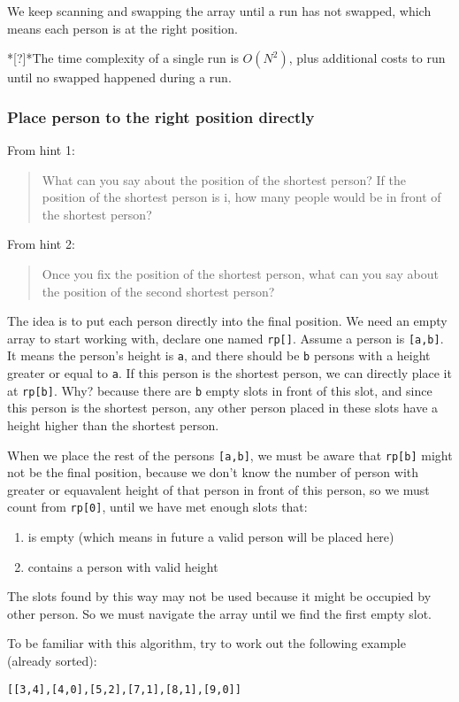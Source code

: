 \documentclass[11pt]{article}
\begin{document}
We keep scanning and swapping the array until a run has not swapped, which means each person is at the right position.

*[?]*The time complexity of a single run is \(O(N^2)\), plus additional costs to run until no swapped happened during a run.
\subsubsection{Place person to the right position directly}
\label{sec:org4f2c32e}
From hint 1:
\begin{quote}
What can you say about the position of the shortest person? 
If the position of the shortest person is i, how many people would be in front of the shortest person?
\end{quote}

From hint 2:
\begin{quote}
Once you fix the position of the shortest person, what can you say about the position of the second shortest person?
\end{quote}

The idea is to put each person directly into the final position. We need an empty array to start working with, declare one named \texttt{rp[]}. Assume a person is \texttt{[a,b]}. It means the person's height is \texttt{a}, and there should be \texttt{b} persons with a height greater or equal to \texttt{a}. If this person is the shortest person, we can directly place it at \texttt{rp[b]}. Why? because there are \texttt{b} empty slots in front of this slot, and since this person is the shortest person, any other person placed in these slots have a height higher than the shortest person.

When we place the rest of the persons \texttt{[a,b]}, we must be aware that \texttt{rp[b]} might not be the final position, because we don't know the number of person with greater or equavalent height of that person in front of this person, so we must count from \texttt{rp[0]}, until we have met enough slots that:
\begin{enumerate}
\item is empty (which means in future a valid person will be placed here)
\item contains a person with valid height
\end{enumerate}
The slots found by this way may not be used because it might be occupied by other person. So we must navigate the array until we find the first empty slot.

To be familiar with this algorithm, try to work out the following example (already sorted):
\begin{Verbatim}[frame=single]
[[3,4],[4,0],[5,2],[7,1],[8,1],[9,0]]
\end{Verbatim}
\end{document}

